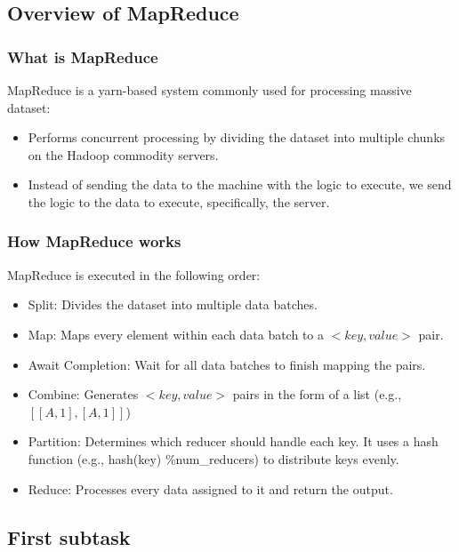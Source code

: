 \subsection{Overview of MapReduce}
\label{subsec:overview-of-mapreduce}

\subsubsection{What is MapReduce}

MapReduce is a yarn-based system commonly used for processing massive dataset:

\begin{itemize}
    \item Performs concurrent processing by dividing the dataset into multiple chunks on the Hadoop commodity servers.
    \item Instead of sending the data to the machine with the logic to execute, we send the logic to the data to execute, specifically, the server.
\end{itemize}

\subsubsection{How MapReduce works}

MapReduce is executed in the following order:

\begin{itemize}
    \item Split: Divides the dataset into multiple data batches.
    \item Map: Maps every element within each data batch to a $<key,value>$ pair.
    \item Await Completion: Wait for all data batches to finish mapping the pairs.
    \item Combine: Generates $<key,value>$ pairs in the form of a list (e.g., $[[A,1],[A,1]]$)
    \item Partition: Determines which reducer should handle each key.
    It uses a hash function (e.g., hash(key) \%num\_reducers) to distribute keys evenly.
    \item Reduce: Processes every data assigned to it and return the output.
\end{itemize}

\subsection{First subtask}
\label{subsec:first-subtask}

